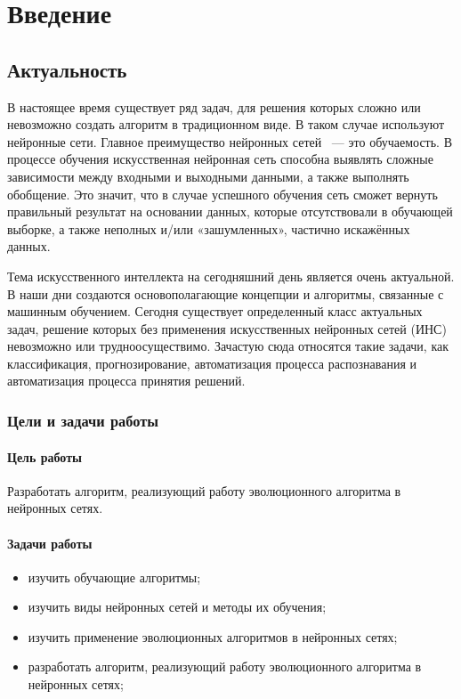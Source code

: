 \newpage

\chapter*{Введение}
\section*{Актуальность}

\indent\indent 
В настоящее время существует ряд задач, для решения которых сложно или невозможно создать алгоритм в традиционном виде. В таком случае используют нейронные сети. Главное преимущество нейронных сетей ~--- это обучаемость. В процессе
обучения искусственная нейронная сеть способна выявлять сложные зависимости
между входными и выходными данными, а также выполнять обобщение. Это
значит, что в случае успешного обучения сеть сможет вернуть правильный
результат на основании данных, которые отсутствовали в обучающей выборке, а
также неполных и/или «зашумленных», частично искажённых данных.

Тема искусственного интеллекта на сегодняшний день является 
очень актуальной. В наши дни создаются основополагающие 
концепции и алгоритмы, связанные с машинным обучением.  
Сегодня существует определенный класс актуальных задач, 
решение которых без применения искусственных нейронных 
сетей (ИНС) невозможно или трудноосуществимо. Зачастую 
сюда относятся такие задачи, как классификация, 
прогнозирование, автоматизация процесса распознавания и автоматизация процесса принятия решений.

\subsection*{Цели и задачи работы}
\subsubsection*{Цель работы}

\indent\indent  Разработать алгоритм, реализующий работу эволюционного алгоритма в нейронных сетях.

\subsubsection*{Задачи работы}
\begin{itemize}
	\item изучить обучающие алгоритмы;
	\item изучить виды нейронных сетей и методы их обучения;
	\item изучить применение эволюционных алгоритмов в нейронных сетях;
	\item разработать алгоритм, реализующий работу эволюционного 
  алгоритма в нейронных сетях;
\end{itemize}


